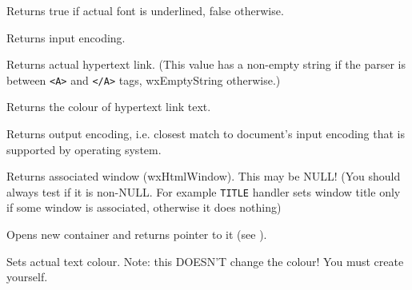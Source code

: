 Returns true if actual font is underlined, false otherwise.

\label{wxhtmlwinparsergetinputencoding}


Returns input encoding.

\label{wxhtmlwinparsergetlink}


Returns actual hypertext link. (This value has a non-empty 
 string
if the parser is between {\tt <A>} and {\tt </A>} tags,
wxEmptyString otherwise.)

\label{wxhtmlwinparsergetlinkcolor}


Returns the colour of hypertext link text.

\label{wxhtmlwinparsergetoutputencoding}


Returns output encoding, i.e. closest match to document's input encoding
that is supported by operating system.

\label{wxhtmlwinparsergetwindow}


Returns associated window (wxHtmlWindow). This may be NULL! (You should always
test if it is non-NULL. For example {\tt TITLE} handler sets window
title only if some window is associated, otherwise it does nothing)

\label{wxhtmlwinparseropencontainer}


Opens new container and returns pointer to it (see ).

\label{wxhtmlwinparsersetactualcolor}


Sets actual text colour. Note: this DOESN'T change the colour!
You must create  yourself.

